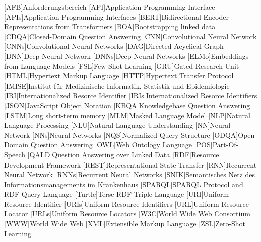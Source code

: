 \begin{acronym}[nogroupskip]
\setlength{\parskip}{0ex}
\setlength{\itemsep}{1.5ex}
[AFB]{Anforderungsbereich}
[API]{Application Programming Interface}
[APIs]{Application Programming Interfaces}
[BERT]{Bidirectional Encoder Representations from Transformers}
[BOA]{Bootstrapping linked data}
[CDQA]{Closed-Domain Question Answering}
[CNN]{Convolutional Neural Network}
[CNNs]{Convolutional Neural Networks}
[DAG]{Directed Acyclical Graph}
[DNN]{Deep Neural Network}
[DNNs]{Deep Neural Networks}
[ELMo]{Embeddings from Language Models}
[FSL]{Few-Shot Learning}
[GRU]{Gated Research Unit}
[HTML]{Hypertext Markup Language}
[HTTP]{Hypertext Transfer Protocol}
[IMISE]{Institut für Medizinische Informatik, Statistik und Epidemiologie}
[IRI]{Internationalized Resorce Identifier}
[IRIs]{Internationalized Resorce Identifiers}
[JSON]{JavaScript Object Notation}
[KBQA]{Knowledgebase Question Answering}
[LSTM]{Long short-term memory}
[MLM]{Masked Language Model}
[NLP]{Natural Language Processing}
[NLU]{Natural Language Understanding}
[NN]{Neural Network}
[NNs]{Neural Networks}
[NQS]{Normalized Query Structure}
[ODQA]{Open-Domain Question Answering}
[OWL]{Web Ontology Language}
[POS]{Part-Of-Speech}
[QALD]{Question Answering over Linked Data}
[RDF]{Resource Development Framework}
[REST]{Representational State Transfer}
[RNN]{Recurrent Neural Network}
[RNNs]{Recurrent Neural Networks}
[SNIK]{Semantisches Netz des Informationsmanagements im Krankenhaus}
[SPARQL]{SPARQL Protocol and RDF Query Language}
[Turtle]{Terse RDF Triple Language}
[URI]{Uniform Resource Identifier}
[URIs]{Uniform Resource Identifiers}
[URL]{Uniform Resource Locator}
[URLs]{Uniform Resource Locators}
[W3C]{World Wide Web Consortium}
[WWW]{World Wide Web}
[XML]{Extensible Markup Language}
[ZSL]{Zero-Shot Learning}
\end{acronym}

